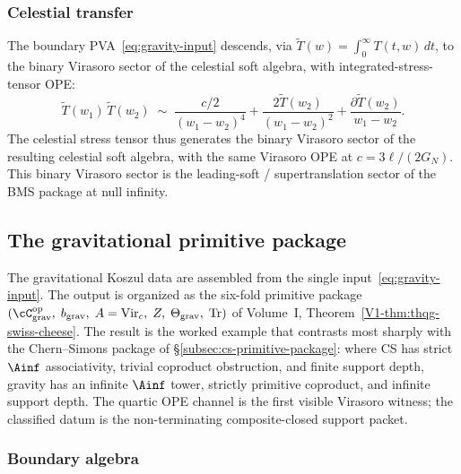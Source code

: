 \subsubsection*{Celestial transfer}

The boundary PVA~\eqref{eq:gravity-input} descends, via
$\widetilde{T}(w) = \int_0^\infty T(t,w)\,dt$, to the binary
Virasoro sector of the celestial soft algebra, with integrated-stress-tensor OPE:
\[
\widetilde{T}(w_1)\,\widetilde{T}(w_2)
\;\sim\;
\frac{c/2}{(w_1 - w_2)^4}
+ \frac{2\widetilde{T}(w_2)}{(w_1 - w_2)^2}
+ \frac{\partial\widetilde{T}(w_2)}{w_1 - w_2}.
\]
The celestial stress tensor thus generates the binary Virasoro sector
of the resulting celestial soft algebra, with the same Virasoro OPE at
$c = 3\ell/(2G_N)$. This binary Virasoro sector is
the leading-soft / supertranslation sector of the
BMS package at null
infinity.


\subsection{The gravitational primitive package}
\label{subsec:gravity-primitive-package}

The gravitational Koszul data are assembled from the single
input~\eqref{eq:gravity-input}.
The output is organized as the six-fold primitive package
$(\cC_{\mathrm{grav}}^{\mathrm{op}},\;
b_{\mathrm{grav}},\;
A = \mathrm{Vir}_c,\;
Z,\; \Theta_{\mathrm{grav}},\; \operatorname{Tr})$
of Volume~I, Theorem~\ref*{V1-thm:thqg-swiss-cheese}.
The result is the worked example that contrasts most sharply
with the Chern--Simons package of
\S\ref{subsec:cs-primitive-package}: where CS has strict
$\Ainf$ associativity, trivial coproduct obstruction, and
finite support depth, gravity has an infinite $\Ainf$ tower,
strictly primitive coproduct, and infinite support depth.
The quartic OPE channel is the first visible Virasoro witness; the
classified datum is the non-terminating composite-closed support packet.

\subsubsection*{Boundary algebra}

